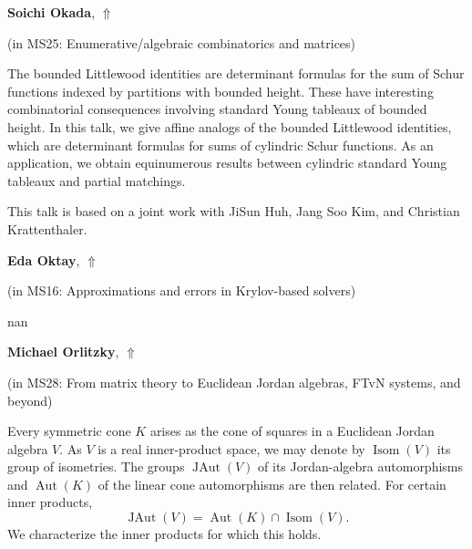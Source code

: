 \documentclass[ILAS2025-program.tex]{subfiles}
\begin{document}
     \hypertarget{down0181}{}\begin{ilasabstract}
    
    \textbf{Soichi Okada},  \hfill \hyperlink{up0181}{$\Uparrow$}
    
    (in {\color{mstitle}MS25: Enumerative/algebraic combinatorics and matrices})
        
        \mtskip
    The bounded Littlewood identities are determinant formulas for 
the sum of Schur functions indexed by partitions with bounded height. 
These have interesting combinatorial consequences involving 
standard Young tableaux of bounded height. In this talk, we 
give affine analogs of the bounded Littlewood identities, which 
are determinant formulas for sums of cylindric Schur functions. 
As an application, we obtain equinumerous results between cylindric 
standard Young tableaux and partial matchings.

This talk is based on a joint work with JiSun Huh, Jang Soo Kim, 
and Christian Krattenthaler.
\end{ilasabstract}
     \hypertarget{down0343}{}\begin{ilasabstract}
    
    \textbf{Eda Oktay},  \hfill \hyperlink{up0343}{$\Uparrow$}
    
    (in {\color{mstitle}MS16: Approximations and errors in Krylov-based solvers})
        
        \mtskip
    nan\end{ilasabstract}
     \hypertarget{down0385}{}\begin{ilasabstract}
    
    \textbf{Michael Orlitzky},  \hfill \hyperlink{up0385}{$\Uparrow$}
    
    (in {\color{mstitle}MS28: From matrix theory to Euclidean Jordan algebras, FTvN systems, and beyond})
        
        \mtskip
    Every symmetric cone $K$ arises as the cone of squares in a Euclidean
Jordan algebra $V$. As $V$ is a real inner-product space, we may
denote by $\operatorname{Isom}\left(V\right)$ its group of
isometries. The groups $\operatorname{JAut}\left(V\right)$ of its
Jordan-algebra automorphisms and $\operatorname{Aut}\left(K\right)$
of the linear cone automorphisms are then related. For certain inner
products,
%
\begin{equation*}
  \operatorname{JAut}\left(V\right)
  =
  \operatorname{Aut}\left(K\right)
  \cap
  \operatorname{Isom}\left(V\right).
\end{equation*}
%
We characterize the inner products for which this holds.
\end{ilasabstract}
\end{document}
